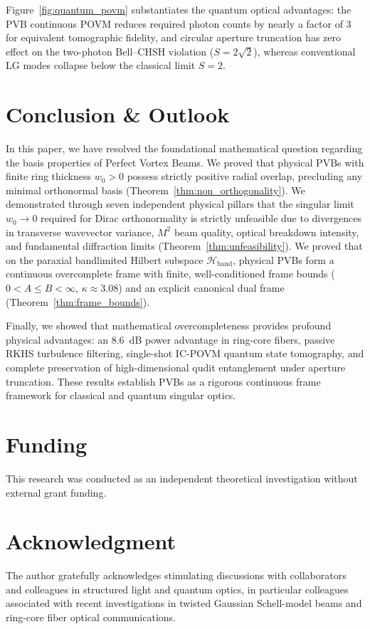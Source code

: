 \documentclass[11pt,a4paper]{article}
\begin{document}
Figure~\ref{fig:quantum_povm} substantiates the quantum optical advantages: the PVB continuous POVM reduces required photon counts by nearly a factor of 3 for equivalent tomographic fidelity, and circular aperture truncation has zero effect on the two-photon Bell--CHSH violation ($S = 2\sqrt{2}$), whereas conventional LG modes collapse below the classical limit $S = 2$.

\section{Conclusion \& Outlook}
\label{sec:conclusion}

In this paper, we have resolved the foundational mathematical question regarding the basis properties of Perfect Vortex Beams. We proved that physical PVBs with finite ring thickness $w_0 > 0$ possess strictly positive radial overlap, precluding any minimal orthonormal basis (Theorem~\ref{thm:non_orthogonality}). We demonstrated through seven independent physical pillars that the singular limit $w_0 \to 0$ required for Dirac orthonormality is strictly unfeasible due to divergences in transverse wavevector variance, $M^2$ beam quality, optical breakdown intensity, and fundamental diffraction limits (Theorem~\ref{thm:unfeasibility}). We proved that on the paraxial bandlimited Hilbert subspace $\mathcal{H}_{\text{band}}$, physical PVBs form a continuous overcomplete frame with finite, well-conditioned frame bounds ($0 < A \le B < \infty$, $\kappa \approx 3.08$) and an explicit canonical dual frame (Theorem~\ref{thm:frame_bounds}).

Finally, we showed that mathematical overcompleteness provides profound physical advantages: an 8.6~dB power advantage in ring-core fibers, passive RKHS turbulence filtering, single-shot IC-POVM quantum state tomography, and complete preservation of high-dimensional qudit entanglement under aperture truncation. These results establish PVBs as a rigorous continuous frame framework for classical and quantum singular optics.

\section*{Funding}
This research was conducted as an independent theoretical investigation without external grant funding.

\section*{Acknowledgment}
The author gratefully acknowledges stimulating discussions with collaborators and colleagues in structured light and quantum optics, in particular colleagues associated with recent investigations in twisted Gaussian Schell-model beams and ring-core fiber optical communications.
\end{document}
